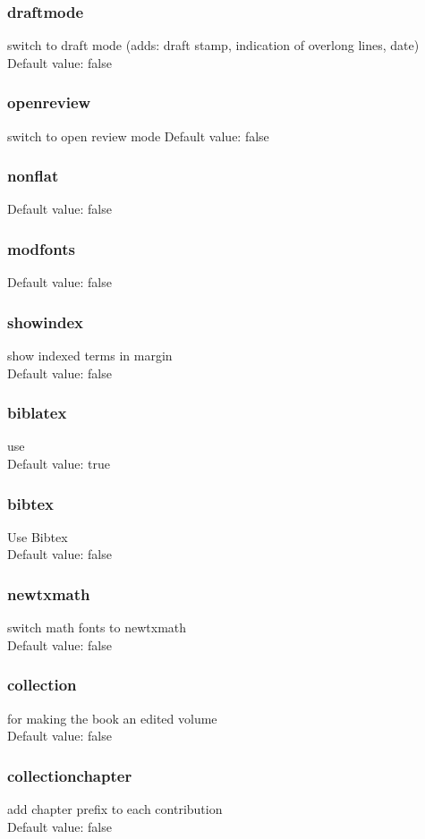 \documentclass[guidelines]{langscibook}
\begin{document}
\subsubsection{draftmode}
switch to draft mode (adds: draft stamp, indication of overlong lines, date)
Default value: false 
\subsubsection{openreview}
switch to open review mode
Default value: false
\subsubsection{nonflat}
Default value: false  
\subsubsection{modfonts}
Default value: false  
\subsubsection{showindex}
show indexed terms in margin\\
Default value: false  
\subsubsection{biblatex}
use \BibLaTeX \\
Default value: true
\subsubsection{bibtex}
Use Bibtex\\
Default value: false  
\subsubsection{newtxmath}
switch math fonts to newtxmath \\
Default value: false  
\subsubsection{collection}
for making the book an edited volume\\
Default value: false  
\subsubsection{collectionchapter}
add chapter prefix to each contribution\\
Default value: false  
\end{document}
